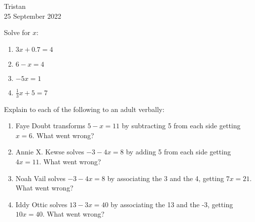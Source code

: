 \documentclass[14pt]{extarticle} %
\begin{document}
\hfill Tristan\\
\null\hfill 25 September 2022

\vspace{10mm}

Solve for $x$:
\begin{enumerate}[label=\Alph*.), itemsep=\fill]
\item $3x+0.7=4$
\item $6-x=4$
\item $-5x=1$
\item $\frac{1}{3}x+5=7$
\vfill\clearpage

\end{enumerate}
Explain to each of the following to an adult verbally:
\begin{enumerate}[resume, label=\Alph*.), itemsep=\fill]

\item Faye Doubt transforms $5-x=11$ by subtracting 5 from each side getting $x=6$. What went wrong?
\item Annie X. Kewse solves $-3-4x=8$ by adding 5 from each side getting $4x=11$. What went wrong?
\item Noah Vail solves $-3-4x=8$ by associating the 3 and the 4, getting $7x=21$. What went wrong?
\item Iddy Ottic solves $13-3x=40$ by associating the 13 and the -3, getting $10x=40$. What went wrong?
\vfill\end{enumerate}
\end{document}
